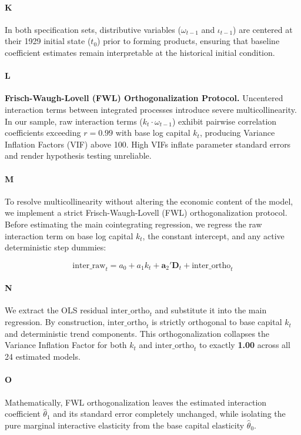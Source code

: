 \paragraph{K}
In both specification sets, distributive variables ($\omega_{t-1}$ and $\iota_{t-1}$) are centered at their 1929 initial state ($t_0$) prior to forming products, ensuring that baseline coefficient estimates remain interpretable at the historical initial condition.

\paragraph{L}
\textbf{Frisch-Waugh-Lovell (FWL) Orthogonalization Protocol.} Uncentered interaction terms between integrated processes introduce severe multicollinearity. In our sample, raw interaction terms ($k_t \cdot \omega_{t-1}$) exhibit pairwise correlation coefficients exceeding $r = 0.99$ with base log capital $k_t$, producing Variance Inflation Factors (VIF) above 100. High VIFs inflate parameter standard errors and render hypothesis testing unreliable.

\paragraph{M}
To resolve multicollinearity without altering the economic content of the model, we implement a strict Frisch-Waugh-Lovell (FWL) orthogonalization protocol. Before estimating the main cointegrating regression, we regress the raw interaction term on base log capital $k_t$, the constant intercept, and any active deterministic step dummies:

\[\text{inter\_raw}_t = a_0 + a_1 k_t + \mathbf{a}_2' \mathbf{D}_t + \text{inter\_ortho}_t\]

\paragraph{N}
We extract the OLS residual $\text{inter\_ortho}_t$ and substitute it into the main regression. By construction, $\text{inter\_ortho}_t$ is strictly orthogonal to base capital $k_t$ and deterministic trend components. This orthogonalization collapses the Variance Inflation Factor for both $k_t$ and $\text{inter\_ortho}_t$ to exactly \textbf{1.00} across all 24 estimated models.

\paragraph{O}
Mathematically, FWL orthogonalization leaves the estimated interaction coefficient $\hat{\theta}_1$ and its standard error completely unchanged, while isolating the pure marginal interactive elasticity from the base capital elasticity $\hat{\theta}_0$.

